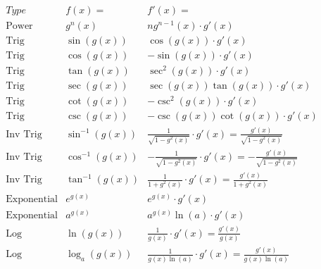 \documentclass{ximera}
\begin{document}
\begin{center}
\[
\begin{array}{c|c|c}
		Type & f(x)= & f'(x)=  \\
		\hline
		\text{Power} & g^n(x) & ng^{n-1}(x)\cdot g'(x)  \\[6pt]
		\hline
		\text{Trig} & \sin\left(g(x)\right) & \cos\left(g(x)\right) \cdot g'(x) \\[6pt]
		\text{Trig} & \cos\left(g(x)\right) & -\sin\left(g(x)\right)\cdot g'(x)  \\[6pt]
		\hline
		\text{Trig} & \tan\left(g(x)\right) & \sec^2\left(g(x)\right) \cdot g'(x) \\[6pt]
		\text{Trig} & \sec\left(g(x)\right) & \sec\left(g(x)\right)\tan\left(g(x)\right) \cdot g'(x) \\[6pt]
		\hline
		\text{Trig} & \cot\left(g(x)\right) & -\csc^2\left(g(x)\right) \cdot g'(x)  \\[6pt]
		\text{Trig} & \csc\left(g(x)\right) & -\csc\left(g(x)\right)\cot\left(g(x)\right) \cdot g'(x)  \\[6pt]
		\hline
		\text{Inv Trig} & \sin^{-1}\left(g(x)\right) & \displaystyle{\frac{1}{\sqrt{1-g^2(x)}}} \cdot g'(x) = \frac{g'(x)}{\sqrt{1-g^2(x)}}  \\[6pt]
		\text{Inv Trig} & \cos^{-1}\left(g(x)\right) & \displaystyle{-\frac{1}{\sqrt{1-g^2(x)}}} \cdot g'(x) = -\frac{g'(x)}{\sqrt{1-g^2(x)}}\\[6pt]
		\text{Inv Trig} & \tan^{-1}\left(g(x)\right) & \displaystyle{\frac{1}{1+g^2(x)}} \cdot g'(x) = \frac{g'(x)}{1+g^2(x)} \\
		\hline
		\text{Exponential} & e^{g(x)} & e^{g(x)} \cdot g'(x) \\[6pt]
		\text{Exponential} & a^{g(x)} & a^{g(x)}\ln(a) \cdot g'(x) \\[6pt]
		\hline
		\text{Log} & \ln\left(g(x)\right) & \displaystyle{\frac{1}{g(x)}}\cdot g'(x) = \frac{g'(x)}{g(x)} \\[6pt]
		\text{Log} & \log_a\left(g(x)\right) & \displaystyle{\frac{1}{g(x)\ln(a)}}\cdot g'(x) = \frac{g'(x)}{g(x)\ln(a)}
	\end{array}
    \]
\end{center}
\end{document}
